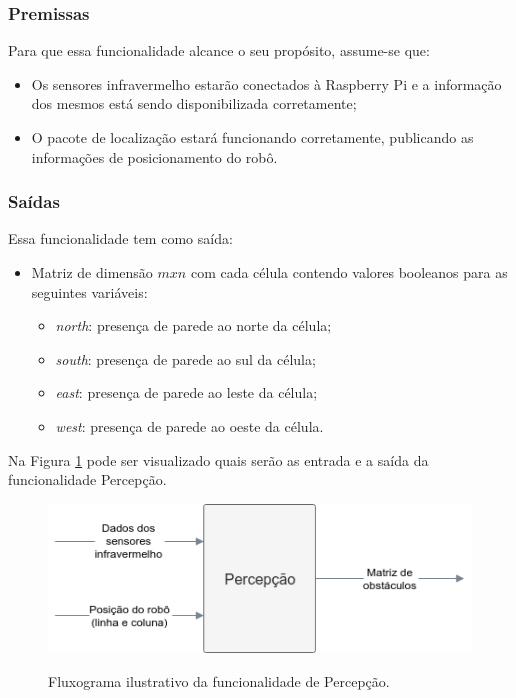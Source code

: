 \subsubsection{Premissas}
Para que essa funcionalidade alcance o seu propósito, assume-se que:
\begin{itemize}
	\item Os sensores infravermelho estarão conectados à Raspberry Pi e a informação dos mesmos está sendo disponibilizada corretamente;
	\item O pacote de localização estará funcionando corretamente, publicando as informações de posicionamento do robô.
\end{itemize}

\subsubsection{Saídas}
Essa funcionalidade tem como saída:
\begin{itemize}
	\item Matriz de dimensão $mxn$ com cada célula contendo valores booleanos para as seguintes variáveis:
	\begin{itemize}
		\item \textit{north}: presença de parede ao norte da célula;
		\item \textit{south}: presença de parede ao sul da célula;
		\item \textit{east}: presença de parede ao leste da célula;
		\item \textit{west}: presença de parede ao oeste da célula.
	\end{itemize}
\end{itemize}

Na Figura \ref{fig:especificacao_funcional_percepcao} pode ser visualizado quais serão as entrada e a saída da funcionalidade Percepção.

\begin{figure}[H]
	\centering
	\caption{Fluxograma ilustrativo da funcionalidade de Percepção.}
	\includegraphics[width=1\textwidth]
	{Figures/especificacao_funcional_percepcao}
	\label{fig:especificacao_funcional_percepcao}
\end{figure}

